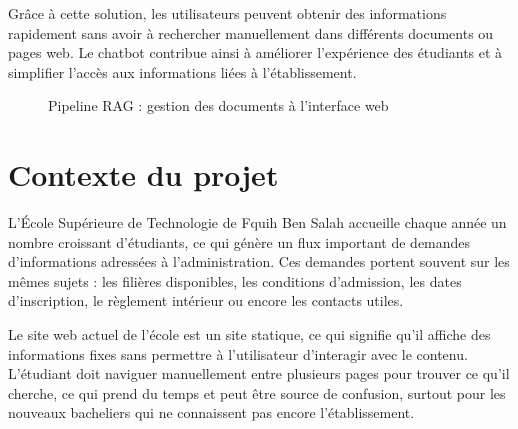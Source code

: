 \documentclass[12pt, a4paper, twoside]{report}
\begin{document}
Grâce à cette solution, les utilisateurs peuvent obtenir des informations rapidement sans avoir à rechercher manuellement dans différents documents ou pages web. Le chatbot contribue ainsi à améliorer l’expérience des étudiants et à simplifier l’accès aux informations liées à l’établissement.
\newline
\newline
\begin{center}
\begin{figure}[htbp]
  \centering
  \caption{Pipeline RAG : gestion des documents à l'interface web}
  \label{fig:pipeline-rag}
\end{figure}
\end{center}
\newpage
\section{Contexte du projet}
L'École Supérieure de Technologie de Fquih Ben Salah accueille chaque année un nombre croissant d'étudiants, ce qui génère un flux important de demandes \newline d'informations adressées à l'administration. Ces demandes portent souvent sur les mêmes sujets : les filières disponibles, les conditions d'admission, les dates d'inscription, le \newline règlement intérieur ou encore les contacts utiles.
\newline

Le site web actuel de l'école est un site statique, ce qui signifie qu'il affiche des \newline informations fixes sans permettre à l'utilisateur d'interagir avec le contenu.
L'étudiant doit naviguer manuellement entre plusieurs pages pour trouver ce qu'il cherche, ce qui prend du temps et peut être source de confusion, surtout pour les nouveaux bacheliers qui ne connaissent pas encore l'établissement.
\newline
\end{document}
